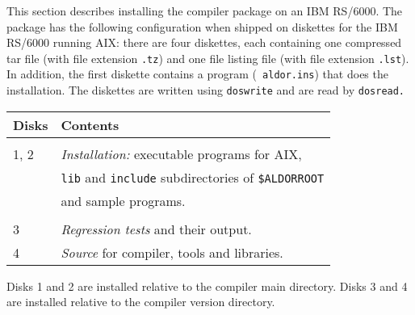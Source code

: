 
This section describes installing the compiler package on an IBM RS/6000.
The package has the following configuration when shipped
on diskettes for the IBM RS/6000 running AIX: there are four
diskettes, each containing one compressed tar file (with file
extension {\tt .tz}) and one file listing file (with file extension
{\tt .lst}).
In addition, the first diskette contains a program ({\tt
aldor.ins}) that does the installation.
The diskettes are written using {\tt doswrite} and are read by {\tt dosread.}

\begin{tabular}{@{}l|l@{}}
\bf Disks &  \bf Contents \\ \hline \\
1, 2     &  {\it Installation:\/} executable programs for AIX, \\
         &  {\tt lib} and {\tt include} subdirectories of {\tt \$ALDORROOT} \\
         &  and sample programs. \\ \\
3        &  {\it Regression tests\/} and their output. \\
4        &  {\it Source} for compiler, tools and libraries. \\
\end{tabular}

Disks 1 and 2 are installed relative to the compiler main
directory.
Disks 3 and 4 are installed relative to the compiler version
directory.

